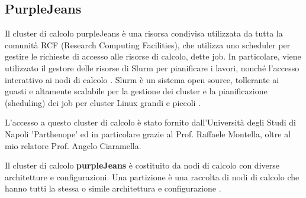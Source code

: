\subsection{PurpleJeans}
Il cluster di calcolo purpleJeans è una risorsa condivisa utilizzata da tutta la comunità RCF (Research Computing Facilities), che utilizza uno scheduler per gestire le richieste di accesso alle risorse di calcolo, dette job. In particolare, viene utilizzato il gestore delle risorse di Slurm per pianificare i lavori, nonché l’accesso interattivo ai nodi di calcolo \cite{purpleJeans}.
Slurm è un sistema open source, tollerante ai guasti e altamente scalabile per la gestione dei cluster e la pianificazione (sheduling) dei job per cluster Linux grandi e piccoli \cite{purpleJeans}.

L'accesso a questo cluster di calcolo è stato fornito dall'Università degli Studi di Napoli 'Parthenope' ed in particolare grazie al Prof. Raffaele Montella, oltre al mio relatore Prof. Angelo Ciaramella.

Il cluster di calcolo \textbf{purpleJeans} è costituito da nodi di calcolo con diverse architetture e configurazioni. Una partizione è una raccolta di nodi di calcolo che hanno tutti la stessa o simile architettura e configurazione \cite{purpleJeans}.

